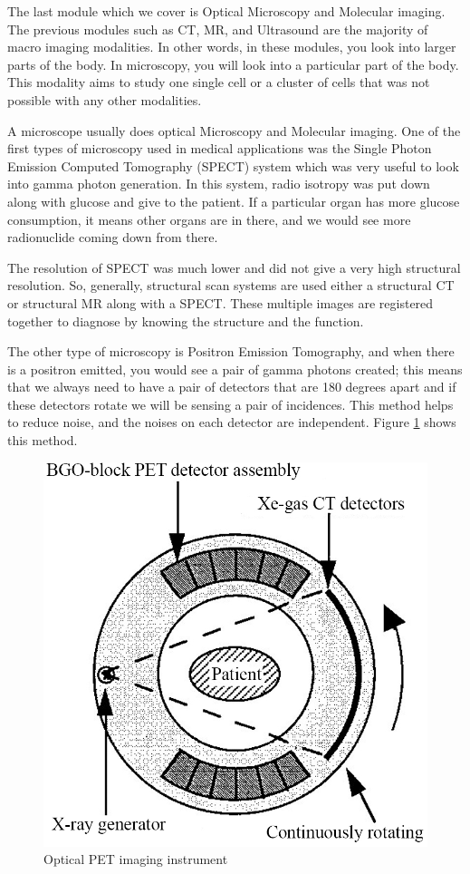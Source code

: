 The last module which we cover is Optical Microscopy and Molecular imaging. The previous modules such as CT, MR, and Ultrasound are the majority of macro imaging modalities. In other words, in these modules, you look into larger parts of the body. In microscopy, you will look into a particular part of the body. This modality aims to study one single cell or a cluster of cells that was not possible with any other modalities.

A microscope usually does optical Microscopy and Molecular imaging. One of the first types of microscopy used in medical applications was the Single Photon Emission Computed Tomography (SPECT) system which was very useful to look into gamma photon generation. In this system, radio isotropy was put down along with glucose and give to the patient. If a particular organ has more glucose consumption, it means other organs are in there, and we would see more radionuclide coming down from there.

The resolution of SPECT was much lower and did not give a very high structural resolution. So, generally, structural scan systems are used either a structural CT or structural MR along with a SPECT. These multiple images are registered together to diagnose by knowing the structure and the function.

The other type of microscopy is Positron Emission Tomography, and when there is a positron emitted, you would see a pair of gamma photons created; this means that we always need to have a pair of detectors that are 180 degrees apart and if these detectors rotate we will be sensing a pair of incidences. This method helps to reduce noise, and the noises on each detector are independent. Figure \ref{fig13} shows this method. 

\begin{figure}[htbp]
	\centering \includegraphics[width=0.7\columnwidth]{./figures/Fig13.jpg}
	\caption{Optical PET imaging instrument}
	\label{fig13}
\end{figure}

